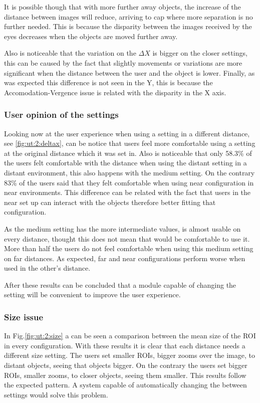 \documentclass[10pt,a4paper,twocolumn,twoside]{article}
\begin{document}
	It is possible though that with more further away objects, the increase of the distance between images will reduce, arriving to cap where more separation is no further needed. This is because the disparity between the images received by the eyes decreases when the objects are moved further away.
	
	Also is noticeable that the variation on the $\Delta X$ is bigger on the closer settings, this can be caused by the fact that slightly movements or variations are more significant when the distance between the user and the object is lower. 
	Finally, as was expected this difference is not seen in the Y, this is because the Accomodation-Vergence issue is related with the disparity in the X axis. 
	
	\subsubsection{User opinion of the settings }
	Looking now at the user experience when using a setting in a different distance, see \ref{fig:ut:2:deltax}, can be notice that users feel more comfortable using a setting at the original distance which it was set in. Also is noticeable that only 58.3\% of the users felt comfortable with the distance when using the distant setting in a distant environment, this also happens with the medium setting. On the contrary 83\% of the users said that they felt comfortable when using near configuration in near environments. This difference can be related with the fact that users in the near set up can interact with the objects therefore better fitting that configuration. 
	
	As the medium setting has the more intermediate values, is almost usable on every distance, thought this does not mean that would be comfortable to use it. More than half the users do not feel comfortable when using this medium setting on far distances. As expected, far and near configurations perform worse when used in the other's distance.
	
	After these results can be concluded that a module capable of changing the setting will be convenient to improve the user experience. 
	
	\subsubsection{Size issue}
	
	In Fig.\ref{fig:ut:2:size} a can be seen a comparison between the mean size of the ROI in every configuration. With these results it is clear that each distance needs a different size setting.  The users set smaller ROIs, bigger zooms over the image, to distant objects, seeing that objects bigger. On the contrary the users set bigger ROIs, smaller zooms, to closer objects, seeing them smaller. This results follow the expected pattern. A system capable of automatically changing the between settings would solve this problem. 
	
\end{document}
